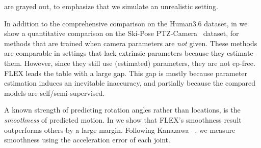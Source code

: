 \begin{enumerate}[nosep,leftmargin=0cm,itemindent=0.5cm,labelwidth=\itemindent,labelsep=0cm,align=left]
are grayed out, to emphasize that we simulate an unrealistic setting.
\sr{Next, we show that a 3\% perturbation, rather than estimation, is fairer toward the compared method, as estimation induces larger inaccuracy.
%
We estimate the extrinsic camera parameters with two leading frameworks, COLMAP~\cite{schoenberger2016sfm} and OpenCV-SFM~\cite{opencv_library}, and obtain errors of 5.5\% and 8.6\%, respectively. The error is the mean value of $\frac{|p-\tilde{p}|}{p}$ for all extrinsic values $p$ and their estimation $\tilde{p}$. Moreover, the estimation process involves friction: OpenCV-SFM 
strongly depends on an initial guess, and COLMAP requires that each pair of cameras observes partially overlapping images, a limiting factor that prevents its usage in settings where the cameras face each other.}
\end{enumerate}


In addition to the comprehensive comparison on the Human3.6 dataset, 
in  we show a quantitative comparison on the Ski-Pose PTZ-Camera~\cite{ski_ptz} dataset, for methods that are trained when camera parameters are \emph{not} given.
These methods are comparable in settings that lack extrinsic parameters because they estimate them. 
However, since they still use (estimated) parameters, they are not ep-free.
FLEX leads the table with a large gap.
This gap is mostly because parameter estimation induces an inevitable inaccuracy, and partially because the compared models are self/semi-supervised. 



A known strength of predicting rotation angles rather than locations, is the \emph{smoothness} of predicted motion. 
In  we show that FLEX's smoothness result outperforms others by a large margin. Following Kanazawa \etal~\cite{kanazawa2019learning}, we measure smoothness using the acceleration error of each joint. 

